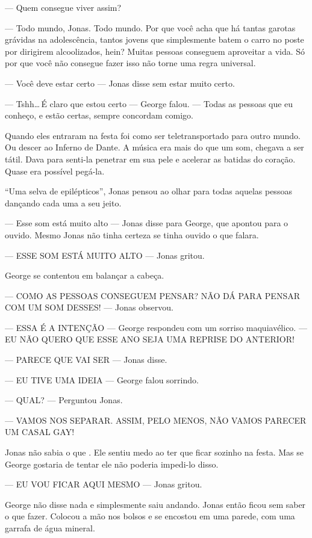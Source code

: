 --- Quem consegue viver assim?

--- Todo mundo, Jonas. Todo mundo. Por que você acha que há tantas garotas grávidas na adolescência, tantos jovens que simplesmente batem o carro no poste por dirigirem alcoolizados, hein? Muitas pessoas conseguem aproveitar a vida. Só por que você não consegue fazer isso\mudanca{,} não torne uma regra universal.

--- Você deve estar certo --- Jonas disse\mudanca{,} sem estar muito certo.

--- Tshh\ldots\,É claro que estou certo --- George falou. --- Todas as pessoas que eu conheço, e estão certas, sempre concordam comigo.

Quando eles entraram na festa foi como ser teletransportado para outro mundo. Ou descer ao Inferno de Dante. A música era mais do que um som, chegava a ser tátil. Dava para senti-la penetrar em sua pele e acelerar as batidas do coração. Quase era possível pegá-la.

``Uma selva de epilépticos'', Jonas pensou ao olhar para todas aquelas pessoas dançando\mudanca{,} cada uma a seu jeito.

--- Esse som está muito alto --- Jonas disse para George, que apontou para o ouvido. Mesmo Jonas não tinha certeza se tinha ouvido o que falara.

--- ESSE SOM ESTÁ MUITO ALTO --- Jonas gritou.

George se contentou em balançar a cabeça.

--- COMO AS PESSOAS CONSEGUEM PENSAR? NÃO DÁ PARA PENSAR COM UM SOM DESSES! --- Jonas observou.

--- ESSA É A INTENÇÃO --- George respondeu com um sorriso maquiavélico. --- EU NÃO QUERO QUE ESSE ANO SEJA UMA REPRISE DO ANTERIOR!

--- PARECE QUE VAI SER --- Jonas disse.

--- EU TIVE UMA IDEIA --- George falou sorrindo.

--- QUAL? --- Perguntou Jonas.

--- VAMOS NOS SEPARAR. ASSIM, PELO MENOS, NÃO VAMOS PARECER UM CASAL GAY!

Jonas não sabia o que . Ele sentiu medo ao ter que ficar sozinho na festa. Mas se George gostaria de tentar\mudanca{,} ele não poderia impedi-lo disso.

--- EU VOU FICAR AQUI MESMO --- Jonas gritou.

George não disse nada e simplesmente saiu andando. Jonas então ficou sem saber o que fazer. Colocou a mão nos bolsos e se encostou em uma parede, com uma garrafa de água mineral.

